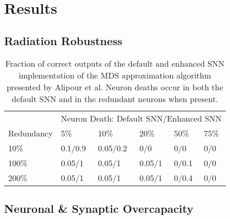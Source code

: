 \section{Results}\label{sec:results}

\subsection{Radiation Robustness}\label{subsec:algorithm_performance}

\begin{table}[H]
\caption{Fraction of correct outputs of the default and enhanced SNN implementation of the MDS approximation algorithm presented by Alipour et al. Neuron deaths occur in both the default SNN and in the redundant neurons when present.}
\begin{tabular}{llllll}
        & \multicolumn{5}{l}{Neuron Death: Default SNN/Enhanced SNN} \\ \cmidrule{2-6}
        Redundancy & 5\%    & 10\%    & 20\%    & 50\%    & 75\%    \\ \hline
        10\%       & 0.1/0.9    & 0.05/0.2     & 0/0       & 0/0       & 0/0       \\
        100\%      & 0.05/1      & 0.05/1       & 0.05/1       & 0/0.1     & 0/0       \\
        200\%      & 0.05/1      & 0.05/1       & 0.05/1       & 0/0.4     & 0/0   
\end{tabular}
\end{table}


\subsection{Neuronal \& Synaptic Overcapacity}\label{subsec:results_neuronal_synaptic_overcapacity}

